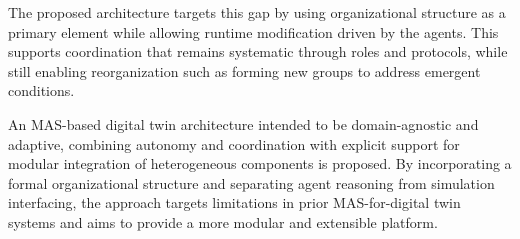 The proposed architecture targets this gap by using organizational structure as a primary element while allowing runtime modification driven by the agents. This supports coordination that remains systematic through roles and protocols, while still enabling reorganization such as forming new groups to address emergent conditions.

An MAS-based digital twin architecture intended to be domain-agnostic and adaptive, combining autonomy and coordination with explicit support for modular integration of heterogeneous components is proposed. By incorporating a formal organizational structure and separating agent reasoning from simulation interfacing, the approach targets limitations in prior MAS-for-digital twin systems and aims to provide a more modular and extensible platform.
